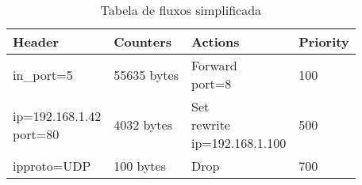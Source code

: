 
\begin{table}[h!]
    \centering
    \begin{tabular}{ | l | l | l | l |}
    \hline
    \textbf{Header} & \textbf{Counters} & \textbf{Actions} & \textbf{Priority} 
    \\ \hline in\_port=5 & 55635 bytes & \pbox{20cm}{Forward \\ port=8} 
    & 100 \\ \hline
    \pbox{20cm}{ip=192.168.1.42 \\ port=80} & 4032 bytes & \pbox{30cm}{Set 
    \\ rewrite \\ ip=192.168.1.100} & 500 \\ \hline ipproto=UDP & 100 bytes 
    & Drop & 700 \\ \hline
    \end{tabular}
    \caption{Tabela de fluxos simplificada}
    \label{tbl:flowtable}
\end{table}
